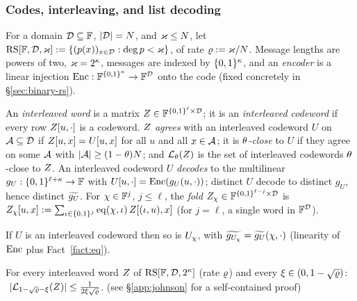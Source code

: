\subsubsection{Codes, interleaving, and list decoding}\label{sec:codes}

For a domain $\mathcal{D} \subseteq \mathbb{F}$, $|\mathcal{D}| = N$, and $\varkappa \le N$, let $\mathrm{RS}[\mathbb{F}, \mathcal{D}, \varkappa] := \{ (p(x))_{x \in \mathcal{D}} : \deg p < \varkappa \}$, of rate $\varrho := \varkappa/N$. Message lengths are powers of two, $\varkappa = 2^{\kappa}$, messages are indexed by $\{0,1\}^{\kappa}$, and an \emph{encoder} is a linear injection $\mathrm{Enc} : \mathbb{F}^{\{0,1\}^{\kappa}} \to \mathbb{F}^{\mathcal{D}}$ onto the code (fixed concretely in \S\ref{sec:binary-rs}).

\begin{definition}\label{def:interleaved}
An \emph{interleaved word} is a matrix $Z \in \mathbb{F}^{\{0,1\}^{\ell} \times \mathcal{D}}$; it is an \emph{interleaved codeword} if every row $Z[u, \cdot]$ is a codeword. $Z$ \emph{agrees} with an interleaved codeword $U$ on $\mathcal{A} \subseteq \mathcal{D}$ if $Z[u,x] = U[u,x]$ for all $u$ and all $x \in \mathcal{A}$; it is \emph{$\theta$-close} to $U$ if they agree on some $\mathcal{A}$ with $|\mathcal{A}| \ge (1-\theta)N$; and $\mathcal{L}_\theta(Z)$ is the set of interleaved codewords $\theta$-close to $Z$. An interleaved codeword $U$ \emph{decodes} to the multilinear $g_U : \{0,1\}^{\ell + \kappa} \to \mathbb{F}$ with $U[u, \cdot] = \mathrm{Enc}(g_U(u, \cdot))$; distinct $U$ decode to distinct $g_U$, hence distinct $\widetilde{g_U}$. For $\chi \in \mathbb{F}^{j}$, $j \le \ell$, the \emph{fold} $Z_\chi \in \mathbb{F}^{\{0,1\}^{\ell - j} \times \mathcal{D}}$ is $Z_\chi[u, x] := \sum_{\iota \in \{0,1\}^{j}} \operatorname{eq}(\chi, \iota)\, Z[(\iota, u), x]$ (for $j = \ell$, a single word in $\mathbb{F}^{\mathcal{D}}$).
\end{definition}

\begin{fact}\label{fact:fold-decode}
If $U$ is an interleaved codeword then so is $U_\chi$, with $\widetilde{g_{U_\chi}} = \widetilde{g_U}(\chi, \cdot)$ (linearity of $\mathrm{Enc}$ plus Fact~\ref{fact:eq}).
\end{fact}

\begin{theorem}\label{thm:johnson-interleaved}
For every interleaved word $Z$ of $\mathrm{RS}[\mathbb{F},\mathcal{D},2^\kappa]$ (rate $\varrho$) and every $\xi \in (0, 1-\sqrt{\varrho})$: $\ |\mathcal{L}_{1-\sqrt{\varrho}-\xi}(Z)| \le \frac{1}{2\xi\sqrt{\varrho}}$. (see \S\ref{app:johnson} for a self-contained proof)
\end{theorem}

